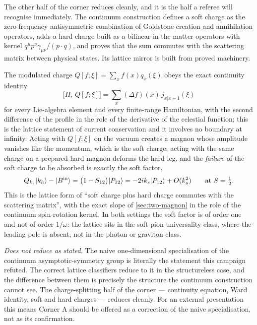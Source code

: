 The other half of the corner reduces cleanly, and it is the half a referee will
recognise immediately. The continuum construction defines a soft charge as the
zero-frequency antisymmetric combination of Goldstone creation and annihilation
operators, adds a hard charge built as a bilinear in the matter operators with
kernel $q^\mu p^\nu\gamma_{\mu\nu}/(p\cdot q)$, and proves that the sum
commutes with the scattering matrix between physical states. Its lattice mirror
is built from proved machinery.

The modulated charge $Q[f;\xi]=\sum_xf(x)q_x(\xi)$ obeys the exact continuity
identity
\begin{equation}
  \bigl[H,\,Q[f;\xi]\bigr]=\sum_x(\Delta f)(x)\,j_{x|x+1}(\xi)
  \label{eq:red-continuity}
\end{equation}
for every Lie-algebra element and every finite-range Hamiltonian, with the
second difference of the profile in the role of the derivative of the celestial
function; this is the lattice statement of current conservation and it involves
no boundary at infinity. Acting with $Q[f;\xi]$ on the vacuum creates a magnon
whose amplitude vanishes like the momentum, which is the soft charge; acting
with the same charge on a prepared hard magnon deforms the hard leg, and the
\emph{failure} of the soft charge to be absorbed is exactly the soft factor,
\begin{equation}
  Q_{k_s}|k_h\rangle-|B^{\mathrm{in}}\rangle
  =\bigl(1-S_{12}\bigr)|P_{12}\rangle
  =-2ik_s|P_{12}\rangle+O(k_s^2)
  \qquad\text{at }S=\tfrac12 .
  \label{eq:red-soft-hard-defect}
\end{equation}
This is the lattice form of ``soft charge plus hard charge commutes with the
scattering matrix'', with the exact slope of \cref{sec:two-magnon} in the role
of the continuum spin-rotation kernel. In both settings the soft factor is of
order one and not of order $1/\omega$: the lattice sits in the soft-pion
universality class, where the leading pole is absent, not in the photon or
graviton class.


\begin{observation}
\label{obs:verdict-symmetry}
\emph{Does not reduce as stated.} The naive one-dimensional specialisation of
the continuum asymptotic-symmetry group is literally the statement this campaign
refuted. The correct lattice classifiers reduce to it in the structureless case,
and the difference between them is precisely the structure the continuum
construction cannot see. The charge-splitting half of the corner --- continuity
equation, Ward identity, soft and hard charges --- reduces cleanly. For an
external presentation this means Corner A should be offered as a correction of
the naive specialisation, not as its confirmation.
\end{observation}

